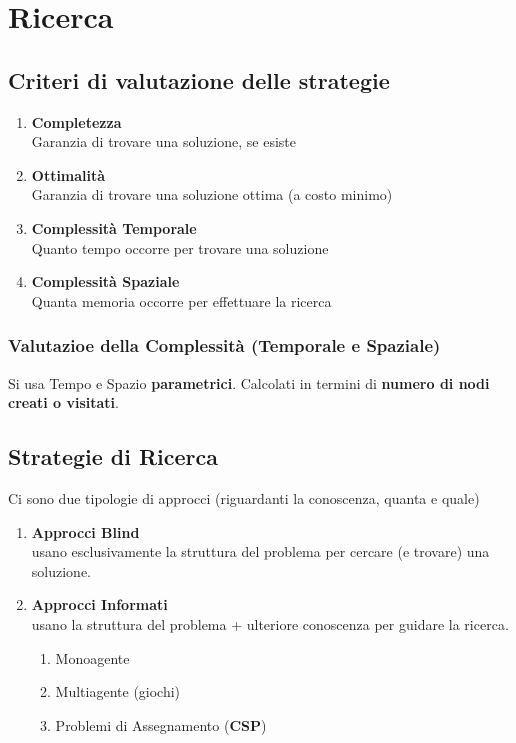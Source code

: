 \documentclass[14pt]{extarticle}
\begin{document}
\section{Ricerca}
\subsection{Criteri di valutazione delle strategie}
\begin{enumerate}
    \item \textbf{Completezza}\\
            Garanzia di trovare una soluzione, se esiste
    \item \textbf{Ottimalità}\\
            Garanzia di trovare una soluzione ottima (a costo minimo)
    \item \textbf{Complessità Temporale}\\
            Quanto tempo occorre per trovare una soluzione
    \item \textbf{Complessità Spaziale}\\
            Quanta memoria occorre per effettuare la ricerca
\end{enumerate}
\subsubsection{Valutazioe della Complessità (Temporale e Spaziale)}
Si usa Tempo e Spazio \textbf{parametrici}. Calcolati in termini di \textbf{numero di nodi creati o visitati}.
\subsection{Strategie di Ricerca}
Ci sono due tipologie di approcci (riguardanti la conoscenza, quanta e quale)
\begin{enumerate}
    \item \textbf{Approcci Blind}\\
        usano esclusivamente la struttura del problema per cercare (e trovare) una soluzione.
    \item \textbf{Approcci Informati}\\
        usano la struttura del problema + ulteriore conoscenza per guidare la ricerca.
        \begin{enumerate}
            \item Monoagente
            \item Multiagente (giochi)
            \item Problemi di Assegnamento (\textbf{CSP})
        \end{enumerate}
\end{enumerate}
\end{document}

